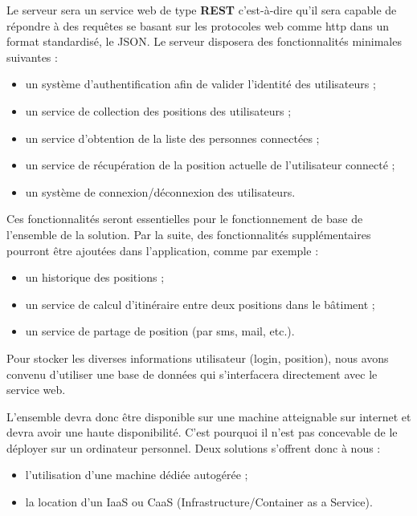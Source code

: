 Le serveur sera un service web de type \textbf{REST} c’est-à-dire qu’il sera capable de répondre à des requêtes se basant sur les protocoles web comme http dans un format standardisé, le JSON.
Le serveur disposera des fonctionnalités minimales suivantes :

\begin{itemize}
    \item un système d’authentification afin de valider l’identité des utilisateurs ;
    \item un service de collection des positions des utilisateurs ;
    \item un service d’obtention de la liste des personnes connectées ;
    \item un service de récupération de la position actuelle de l'utilisateur connecté ;
    \item un système de connexion/déconnexion des utilisateurs.
\end{itemize}

Ces fonctionnalités seront essentielles pour le fonctionnement de base de l'ensemble de la solution. Par la suite, des fonctionnalités supplémentaires pourront être ajoutées dans l'application, comme par exemple :

\begin{itemize}
    \item un historique des positions ;
    \item un service de calcul d'itinéraire entre deux positions dans le bâtiment ;
    \item un service de partage de position (par sms, mail, etc.).
\end{itemize}

Pour stocker les diverses informations utilisateur (login, position), nous avons convenu d'utiliser une base de données qui s'interfacera directement avec le service web.

L’ensemble devra donc être disponible sur une machine atteignable sur internet et devra avoir une haute disponibilité. C’est pourquoi il n’est pas concevable de le déployer sur un ordinateur personnel. Deux solutions s’offrent donc à nous :

\begin{itemize}
    \item l’utilisation d’une machine dédiée autogérée ;
    \item la location d’un IaaS ou CaaS (Infrastructure/Container as a Service).
\end{itemize}

